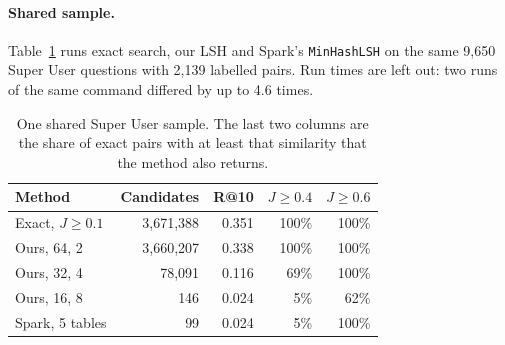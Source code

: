 {\paragraph{Shared sample.} Table~\ref{tab:ws4-shared} runs exact search, our LSH and Spark's
\texttt{MinHashLSH} on the same 9,650 Super User questions with 2,139 labelled pairs. Run times are
left out: two runs of the same command differed by up to 4.6 times.

\begin{table}[h]
  \centering
  \small
  \setlength{\tabcolsep}{3pt}
  \caption{One shared Super User sample. The last two columns are the share of exact pairs with at
  least that similarity that the method also returns.}
  \label{tab:ws4-shared}
  \begin{tabular}{@{}lrrrr@{}}
    \toprule
    Method & Candidates & R@10 & $J\ge0.4$ & $J\ge0.6$ \\
    \midrule
    Exact, $J\ge0.1$ & 3,671,388 & 0.351 & 100\% & 100\% \\ %
    Ours, 64, 2 & 3,660,207 & 0.338 & 100\% & 100\% \\ %
    Ours, 32, 4 & 78,091 & 0.116 & 69\% & 100\% \\ %
    Ours, 16, 8 & 146 & 0.024 & 5\% & 62\% \\ %
    Spark, 5 tables & 99 & 0.024 & 5\% & 100\% \\ %
    \bottomrule
  \end{tabular}
\end{table}
}

